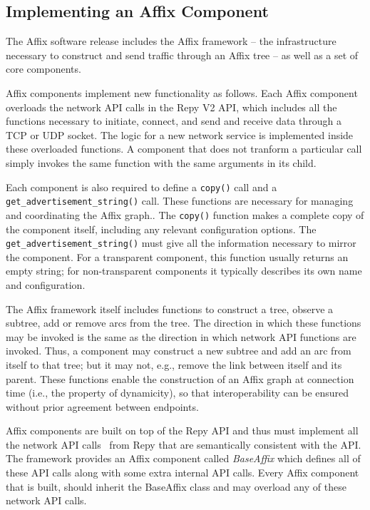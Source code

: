 \subsection{Implementing an Affix Component}
\label{subsec-affix}

The Affix software release includes the Affix framework -- the infrastructure 
necessary to construct and send traffic through an Affix tree -- 
as well as a set of core components.

Affix components implement new functionality as follows.
Each Affix component overloads the network API calls in the 
Repy V2 API, which includes all the functions necessary to initiate, 
connect, and send and receive data through a TCP or UDP socket.
The logic for a new network service is implemented inside
these overloaded functions.
A component that does not tranform a particular call simply 
invokes the same function 
with the same arguments in its child.


Each component is also required to define a \texttt{copy()}
call and a  \texttt{get\_advertisement\_string()} call.
These functions are necessary for managing and 
coordinating the Affix graph..
The \texttt{copy()} function makes a complete 
copy of the component itself, 
including any relevant configuration options.
The \texttt{get\_advertisement\_string()} must give 
all the information necessary to mirror the component.
For a transparent component, this function usually 
returns an empty string; for non-transparent components
it typically 
describes its own name and configuration.


The Affix framework itself includes functions to construct a tree,
observe a subtree, add or remove arcs from the tree. 
The direction in which these functions may be invoked is the 
same as the direction in which network API functions are 
invoked. Thus, a component may construct 
a new subtree and add an arc from itself to that tree;
but it may not, e.g., remove the link between itself and its parent.
These functions enable the construction of an Affix graph 
at connection time (i.e., the property of dynamicity), 
so that interoperability can be ensured without prior agreement
 between endpoints.


 \iffalse


Affix components are built on top of the Repy API and thus must implement
all the network API calls~\cite{RepyV2API} from Repy that are semantically consistent with
the API. The framework provides an Affix component called \textit{BaseAffix}
which defines all of these API calls along with some extra internal API calls.
Every Affix component that is built, should inherit the BaseAffix class 
and may overload any of these network API calls. 


